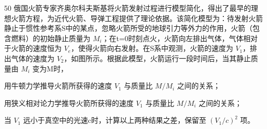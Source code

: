 \begin{problem}[第32届全国中学生物理竞赛决赛]{50}
俄国火箭专家齐奥尔科夫斯基将火箭发射过程进行模型简化，得出了最早的理想火箭方程，为近代火箭、导弹工程提供了理论依据。该简化模型为：待发射火箭静止于惯性参考系S中的某点，忽略火箭所受的地球引力等外力的作用，火箭（包含燃料）的初始静止质量为 $M_{i}$；在t=0时刻点火，火箭向左排出气体，气体相对于火箭的速度恒为 $V_{e}$，使得火箭向右发射。在S系中观测，火箭的速度为 $V_{1}$，排出气体的速度为 $V_{2}$，如图所示。根据此模型，火箭运行一段时间后，当其静止质量由 $M_{i}$ 变为M时，
\begin{subproblem}
用牛顿力学推导火箭所获得的速度 $V_{1}$ 与质量比 $M/M_{i}$ 之间的关系；
\end{subproblem}
\begin{subproblem}
用狭义相对论力学推导火箭所获得的速度 $V_{1}$ 与质量比 $M/M_{i}$ 之间的关系；
\end{subproblem}
\begin{subproblem}
当 $V_{1}$ 远小于真空中的光速c时，计算以上两种结果之差，保留至 $(V_{1}/c)^{2}$ 项。
\end{subproblem}
\end{problem}